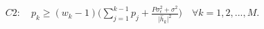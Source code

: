 \documentclass[preview]{standalone}
\begin{document}
\begin{align*}
C2:\quad p_k\geq (w_k -1)\big( \sum_{j=1}^{k-1} p_j + \frac{P\sigma_{\epsilon}^2+\sigma^2}{\big|{\hat{h}_k}\big|^2} \big ) \quad \forall k = 1,2,...,M.
\end{align*}
\end{document}
